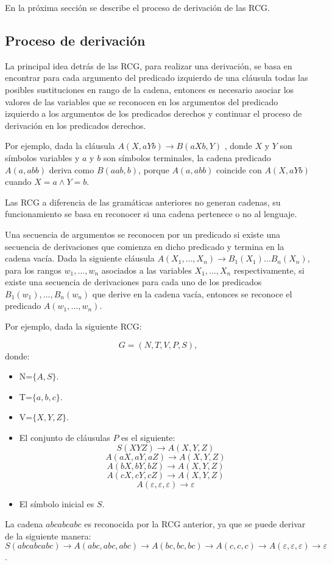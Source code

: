 En la próxima sección se describe el proceso de derivación de las RCG.
\subsection{Proceso de derivación}

La principal idea detrás de las RCG, para realizar una derivación, se basa en encontrar para cada argumento del predicado izquierdo de una cláusula todas las
posibles sustituciones en rango de la cadena, entonces es necesario asociar los valores de las variables que se reconocen
en los argumentos del predicado izquierdo a los argumentos de los predicados derechos y continuar
el proceso de derivación en los predicados derechos.

Por ejemplo, dada la cláusula $A(X,aYb)\to B(aXb,Y)$ , donde $X$ y $Y$ son símbolos variables y $a$ y $b$
son símbolos terminales, la cadena predicado $A(a,abb)$ deriva como $B(aab,b)$, porque $A(a,abb)$
coincide con $A(X,aYb)$ cuando $ X=a \wedge Y=b$.

Las RCG a diferencia de las gramáticas anteriores no generan cadenas, su funcionamiento se basa en reconocer si una cadena pertenece o no al lenguaje.

Una secuencia de argumentos se reconocen por un predicado si existe una secuencia de derivaciones que comienza
en dicho predicado y termina en la cadena vacía. Dada la siguiente cláusula $A(X_1,\ldots,X_n)\to B_1(X_1)\ldots B_n(X_n)$,
para los rangos $w_1,\ldots,w_n$ asociados a las variables $X_1,\ldots,X_n$ respectivamente, si existe una
secuencia de derivaciones para cada uno de los predicados $B_1(w_1),\ldots,B_n(w_n)$ que derive en la cadena vacía,
entonces se reconoce el predicado $A(w_1,\ldots,w_n)$.

Por ejemplo, dada la siguiente RCG:

\[
      G = (N, T, V, P, S),
\]
donde:

\begin{itemize}
      \item  N=$\{A,S\}$.
      \item T=$\{a,b,c\}$.
      \item V=$\{X,Y,Z\}$.
      \item El conjunto de cláusulas $P$ es el siguiente:
            $$S(XYZ)\to A(X,Y,Z)$$
            $$A(aX,aY,aZ)\to A(X,Y,Z)$$
            $$A(bX,bY,bZ)\to A(X,Y,Z)$$
            $$A(cX,cY,cZ)\to A(X,Y,Z)$$
            $$A(\varepsilon,\varepsilon,\varepsilon)\to \varepsilon$$
      \item El símbolo inicial es $S$.
\end{itemize}
La cadena $abcabcabc$ es reconocida por la RCG anterior, ya que se puede derivar de la siguiente manera:
$$S(abcabcabc)\to A(abc,abc,abc)\to A(bc,bc,bc)\to A(c,c,c)\to A(\varepsilon,\varepsilon,\varepsilon)\to \varepsilon$$.

